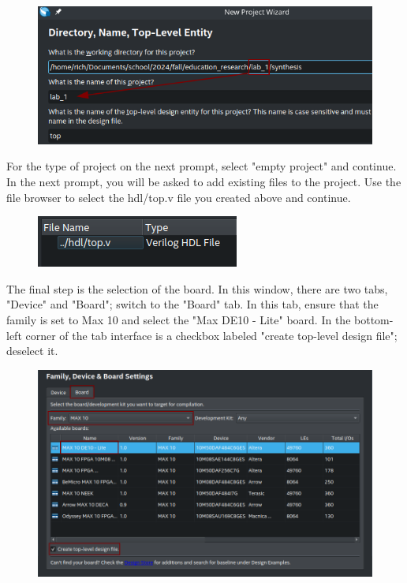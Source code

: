\documentclass[12pt]{labmanual}
\begin{document}
\begin{figure}[H]
    \centering
    \includegraphics[width=\columnwidth]{project_settings.png}
\end{figure}

For the type of project on the next prompt, select "empty project" and continue. In the next prompt, you will be asked to add existing files to the project. Use the file browser to select the hdl/top.v file you created above and continue.

\begin{figure}[H]
    \centering
    \includegraphics[width=0.5\linewidth]{addfiles.png}
\end{figure}

The final step is the selection of the board. In this window, there are two tabs, "Device" and "Board"; switch to the "Board" tab. In this tab, ensure that the family is set to Max 10 and select the "Max DE10 - Lite" board. In the bottom-left corner of the tab interface is a checkbox labeled "create top-level design file"; deselect it.

\begin{figure}[H]
    \centering
    \includegraphics[width=\linewidth]{quartus_board.png}
\end{figure}
\end{document}
